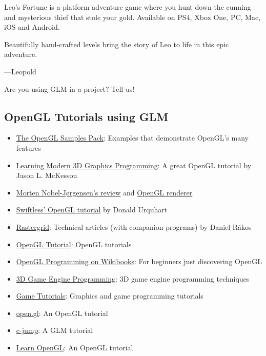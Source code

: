 \documentclass{scrartcl}
\numberwithin{figure}{subsection}
\begin{document}
Leo's Fortune is a platform adventure game where you hunt down the cunning and mysterious thief that stole your gold. Available on PS4, Xbox One, PC, Mac, iOS and Android.

Beautifully hand-crafted levels bring the story of Leo to life in this epic adventure. 



 ---Leopold

Are you using GLM in a project?  Tell us!

\subsection{OpenGL Tutorials using GLM}

\begin{itemize}
  \item \href{http://www.g-truc.net/project-0026.html#menu}{The OpenGL Samples Pack}: Examples that demonstrate OpenGL's many features
  \item \href{http://www.arcsynthesis.org/gltut/}{Learning Modern 3D Graphics Programming}: A great OpenGL tutorial by Jason L. McKesson
  \item \href{http://blog.nobel-joergensen.com/2011/04/02/glm-brilliant-math-library-for-opengl/}{Morten Nobel-Jørgensen's review} and \href{https://github.com/mortennobel/RenderE}{OpenGL renderer} 
  \item \href{http://www.swiftless.com/opengltuts.html}{Swiftless' OpenGL tutorial} by Donald Urquhart
  \item \href{http://rastergrid.com/blog/}{Rastergrid}: Technical articles (with companion programs) by Daniel Rákos
  \item \href{http://www.opengl-tutorial.org}{OpenGL Tutorial}: OpenGL tutorials
  \item \href{http://en.wikibooks.org/wiki/OpenGL_Programming}{OpenGL Programming on Wikibooks}: For beginners just discovering OpenGL
  \item \href{http://3dgep.com/}{3D Game Engine Programming}: 3D game engine programming techniques
  \item \href{http://www.gametutorials.com/opengl-4-matrices-and-glm/}{Game Tutorials}: Graphics and game programming tutorials 
  \item \href{https://open.gl/}{open.gl}: An OpenGL tutorial
  \item \href{http://www.c-jump.com/bcc/common/Talk3/Math/GLM/GLM.html}{c-jump}: A GLM tutorial
  \item \href{http://learnopengl.com/}{Learn OpenGL}: An OpenGL tutorial
\end{itemize}
\end{document}
